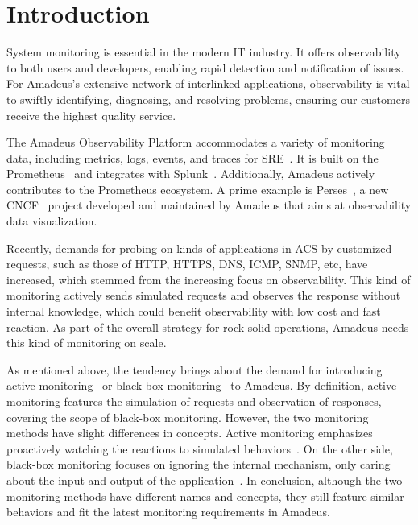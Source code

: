 
\chapter{Introduction}\label{chapter:introduction}

System monitoring is essential in the modern \ac{IT} industry. It offers observability to both users and developers, enabling rapid detection and notification of issues. For Amadeus's extensive network of interlinked applications, observability is vital to swiftly identifying, diagnosing, and resolving problems, ensuring our customers receive the highest quality service. 

The Amadeus Observability Platform accommodates a variety of monitoring data, including metrics, logs, events, and traces for \ac{SRE}~\parencite{beyerSiteReliabilityEngineering2016}. It is built on the Prometheus~\parencite{PrometheusMonitoringSystem} and integrates with Splunk~\parencite{SplunkKeyEnterprise}. Additionally, Amadeus actively contributes to the Prometheus ecosystem. A prime example is Perses~\parencite{PersesPerses2024}, a new \ac{CNCF}~\parencite{CloudNativeComputing} project developed and maintained by Amadeus that aims at observability data visualization. 

Recently, demands for probing on kinds of applications in \ac{ACS} by customized requests, such as those of \ac{HTTP}, \ac{HTTPS}, \ac{DNS}, \ac{ICMP}, \ac{SNMP}, etc, have increased, which stemmed from the increasing focus on observability. This kind of monitoring actively sends simulated requests and observes the response without internal knowledge, which could benefit observability with low cost and fast reaction. As part of the overall strategy for rock-solid operations, Amadeus needs this kind of monitoring on scale. 

As mentioned above, the tendency brings about the demand for introducing active monitoring~\parencite{parkTechnologyTrendsChallenges2023} or black-box monitoring~\parencite{beyerSiteReliabilityEngineering2016} to Amadeus. By definition, active monitoring features the simulation of requests and observation of responses, covering the scope of black-box monitoring. However, the two monitoring methods have slight differences in concepts. Active monitoring emphasizes proactively watching the reactions to simulated behaviors~\parencite{wickramasingheActiveVsPassive2023}. On the other side, black-box monitoring focuses on ignoring the internal mechanism, only caring about the input and output of the application~\parencite{beyerSiteReliabilityEngineering2016}. In conclusion, although the two monitoring methods have different names and concepts, they still feature similar behaviors and fit the latest monitoring requirements in Amadeus. 

